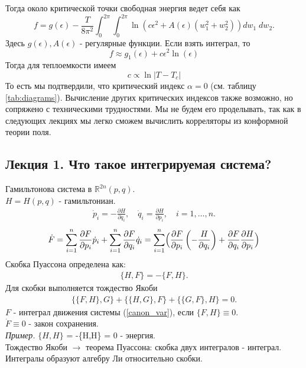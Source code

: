 \documentclass[a4paper,12pt]{article}
\theoremstyle{definition}
\theoremstyle{definition}
\theoremstyle{definition}
\newcommand{\bear}[1]{\begin{eqnarray}\label{#1}}
\newcommand{\ear}{\end{eqnarray}}
\newcommand{\R}{ {\mathbb R} }
\begin{document}
Тогда около критической точки свободная энергия ведет себя как
\begin{equation}
  \label{eq:141}
  f=g(\epsilon)-\frac{T}{8\pi^2}\int_{0}^{2\pi}\int_0^{2\pi}\ln \left( c\epsilon^2 +A(\epsilon)(w_1^2+w_2^2)\right)dw_1\;dw_2.
\end{equation}
Здесь $g(\epsilon), A(\epsilon)$ - регулярные функции. Если взять интеграл, то
\begin{equation}
  \label{eq:142}
  f\approx g_1 (\epsilon)+c\epsilon^2 \ln(\epsilon)
\end{equation}
Тогда для теплоемкости имеем
\begin{equation}
  \label{eq:143}
  c\propto \ln|T-T_c|
\end{equation}
То есть мы подтвердили, что критический индекс $\alpha=0$ (см. таблицу \ref{tab:diagrams}). Вычисление других критических индексов также возможно, но сопряжено с техническими трудностями. Мы не будем его проделывать, так как в следующих лекциях мы легко сможем вычислить корреляторы из конформной теории поля.



\subsection{Лекция 1. Что такое интегрируемая система?}

Гамильтонова система в $\R^{2n}(p,q)$.\\
$H = H(p,q)$ - гамильтониан.
\bear{canon_var}
\dot{p}_{i} = - \frac{\partial H}{\partial q_{i}}, \quad \dot{q}_{i} = \frac{\partial H}{\partial p_{i}}, \quad i=1,\ldots,n.
\ear
\bear{F}
\dot{F} = \sum^{n}_{i=1} \frac{\partial F}{\partial p_{i}}\dot{p}_{i} + \sum^{n}_{i=1} \frac{\partial F}{\partial q_{i}}\dot{q}_{i} = \sum^{n}_{i=1}\Bigl(\frac{\partial F}{\partial p_{i}}\left( - \frac{H}{\partial q_{i}}\right) + \frac{\partial{F}}{\partial q_{i}}\frac{\partial H}{\partial p_{i}} \Bigr)
\ear
Скобка Пуассона определена как:
\bear{Pois_br}
\{H,F\} = -\{F,H\}.
\ear
Для скобки выполняется тождество Якоби
\bear{Yakobi_eq}
\{\{F,H\},G\} + \{\{H,G\},F\} + \{\{G,F\},H\} =0.
\ear
$F$ - интеграл движения системы (\ref{canon_var}), если $\{F,H\} \equiv 0$.\\
$\dot{F} \equiv 0$ - закон сохранения.\\

\textit{Пример.} $\{H,H\}$ = -\{H,H\} = 0 - энергия.\\

Тождество Якоби $\rightarrow$ теорема Пуассона: скобка двух интегралов - интеграл. Интегралы образуют алгебру Ли относительно скобки.\\
\end{document}
